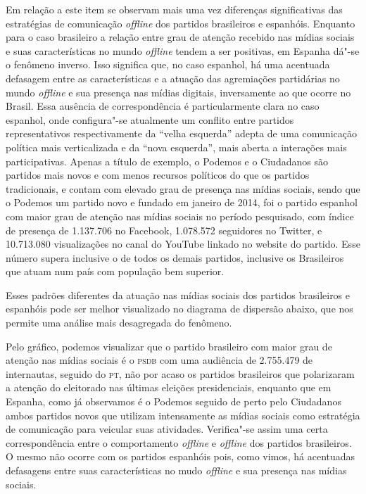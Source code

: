 Em relação a este item se observam mais uma vez diferenças
significativas das estratégias de comunicação \emph{offline} dos partidos
brasileiros e espanhóis. Enquanto para o caso brasileiro a relação entre
grau de atenção recebido nas mídias sociais e suas características no
mundo \emph{offline} tendem a ser positivas, em Espanha dá"-se o fenômeno
inverso. Isso significa que, no caso espanhol, há uma acentuada
defasagem entre as características e a atuação das agremiações
partidárias no mundo \emph{offline} e sua presença nas mídias digitais,
inversamente ao que ocorre no Brasil. Essa ausência de correspondência é
particularmente clara no caso espanhol, onde configura"-se atualmente um
conflito entre partidos representativos respectivamente da ``velha
esquerda'' adepta de uma comunicação política mais verticalizada e da
``nova esquerda'', mais aberta a interações mais participativas. Apenas
a título de exemplo, o Podemos e o Ciudadanos são partidos mais novos e
com menos recursos políticos do que os partidos tradicionais, e contam
com elevado grau de presença nas mídias sociais, sendo que o Podemos um
partido novo e fundado em janeiro de 2014, foi o partido espanhol com
maior grau de atenção nas mídias sociais no período pesquisado, com
índice de presença de 1.137.706 no Facebook, 1.078.572 seguidores no
Twitter, e 10.713.080 visualizações no canal do YouTube linkado no
website do partido. Esse número supera inclusive o de todos os demais
partidos, inclusive os Brasileiros que atuam num país com população bem
superior.

Esses padrões diferentes da atuação nas mídias sociais dos partidos
brasileiros e espanhóis pode ser melhor visualizado no diagrama de
dispersão abaixo, que nos permite uma análise mais desagregada do
fenômeno.

Pelo gráfico, podemos visualizar que o partido brasileiro com maior grau
de atenção nas mídias sociais é o \textsc{psdb} com uma audiência de 2.755.479 de
internautas, seguido do \textsc{pt}, não por acaso os partidos brasileiros que
polarizaram a atenção do eleitorado nas últimas eleições presidenciais,
enquanto que em Espanha, como já observamos é o Podemos seguido de perto
pelo Ciudadanos ambos partidos novos que utilizam intensamente as mídias
sociais como estratégia de comunicação para veicular suas atividades.
Verifica"-se assim uma certa correspondência entre o comportamento
\emph{offline} e \emph{offline} dos partidos brasileiros. O mesmo não ocorre com os
partidos espanhóis pois, como vimos, há acentuadas defasagens entre suas
características no mudo \emph{offline} e sua presença nas mídias sociais.

